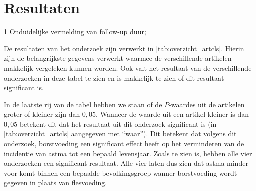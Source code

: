 \documentclass[abstract=true]{scrartcl}
\begin{document}
\section{Resultaten}
\begin{table}
   \centering
   \begin{threeparttable}
\begin{tablenotes}
\item[1] Onduidelijke vermelding van follow-up duur;
\end{tablenotes}

\end{threeparttable}
\label{tab:overzicht_artcls}
\end{table}

De resultaten van het onderzoek zijn verwerkt in \cref{tab:overzicht_artcls}. Hierin zijn de belangrijkste gegevens verwerkt waarmee de verschillende artikelen makkelijk vergeleken kunnen worden. Ook valt het resultaat van de verschillende onderzoeken in deze tabel te zien en is makkelijk te zien of dit resultaat significant is. 

In de laatste rij van de tabel hebben we staan of de $P$-waardes uit de artikelen groter of kleiner zijn dan $0,05$. Wanneer de waarde uit een artikel kleiner is dan $0,05$ betekent dit dat het resultaat uit dit onderzoek significant is (in \cref{tab:overzicht_artcls} aangegeven met “waar”). Dit betekent dat volgens dit onderzoek, borstvoeding een significant effect heeft op het verminderen van de incidentie van astma tot een bepaald levensjaar. Zoals te zien is, hebben alle vier onderzoeken een significant resultaat. Alle vier  laten dus zien dat astma minder voor komt binnen een bepaalde bevolkingsgroep wanner borstvoeding wordt gegeven in plaats van flesvoeding. 
\end{document}
